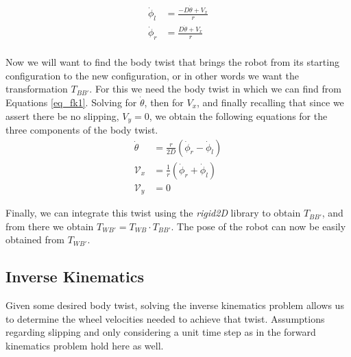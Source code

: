 \documentclass{article}
\begin{document}
\begin{equation} \label{eq_fk1}
   \begin{split}
      \dot \phi_l & = \frac{-D \dot \theta + V_x}{r} \\
      \dot \phi_r & = \frac{D \dot \theta + V_x}{r} \\
   \end{split}
\end{equation}

\noindent
Now we will want to find the body twist that brings the robot
from its starting configuration to the new configuration, or in
other words we want the transformation $T_{BB'}$. For this we need
the body twist in which we can find from Equations \ref{eq_fk1}.
Solving for $\dot \theta$, then for $V_x$, and finally recalling
that since we assert there be no slipping, $V_y = 0$, we obtain
the following equations for the three components of the body twist.
\begin{equation}
   \begin{split}
      \dot \theta & = \frac{r}{2D} \left(\dot \phi_r - \dot \phi_l\right) \\[10pt]
      \mathcal{V}_x & = \frac{1}{r} \left(\dot \phi_r + \dot \phi_l\right) \\[10pt]
      \mathcal{V}_y & = 0
   \end{split}
\end{equation}

\noindent
Finally, we can integrate this twist using the \emph{rigid2D} library
to obtain $T_{BB'}$, and from there we obtain $T_{WB'} = T_{WB} \cdot T_{BB'}$.
The pose of the robot can now be easily obtained from $T_{WB'}$.

\subsection*{Inverse Kinematics}
Given some desired body twist, solving the inverse kinematics problem
allows us to determine the wheel velocities needed to achieve that twist.
Assumptions regarding slipping and only considering a unit time step as in
the forward kinematics problem hold here as well.
\end{document}
